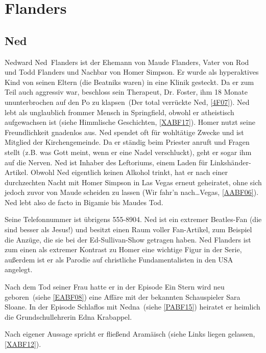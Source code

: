 \section{Flanders}

\subsection{Ned}\label{NedFlanders}
Nedward \glqq Ned\grqq\ Flanders ist der Ehemann von Maude Flanders, Vater von Rod und Todd Flanders und Nachbar von Homer Simpson. Er wurde als hyperaktives Kind von seinen Eltern (die Beatniks waren) in eine Klinik gesteckt. Da er zum Teil auch aggressiv war, beschloss sein Therapeut, Dr. Foster, ihm 18 Monate ununterbrochen auf den Po zu \glqq klapsen\grqq\ (\glqq Der total verrückte Ned\grqq , \ref{4F07}). Ned lebt als unglaublich frommer Mensch in Springfield, obwohl er atheistisch aufgewachsen ist (siehe \glqq Himmlische Geschichten\grqq, \ref{XABF17}). Homer nutzt seine Freundlichkeit gnadenlos aus. Ned spendet oft für wohltätige Zwecke und ist Mitglied der Kirchengemeinde. Da er ständig beim Priester anruft und Fragen stellt (z.B. was Gott meint, wenn er eine Nadel verschluckt), geht er sogar ihm auf die Nerven. Ned ist Inhaber des Leftoriums, einem Laden für Linkshänder-Artikel. Obwohl Ned eigentlich keinen Alkohol trinkt, hat er nach einer durchzechten Nacht mit Homer Simpson in Las Vegas erneut geheiratet, ohne sich jedoch zuvor von Maude scheiden zu lassen (\glqq Wir fahr'n nach\dots Vegas\grqq , \ref{AABF06}). Ned lebt also de facto in Bigamie bis Maudes Tod. 

Seine Telefonnummer ist übrigens 555-8904. Ned ist ein extremer Beatles-Fan (\glqq die sind besser als Jesus!\grqq ) und besitzt einen Raum voller Fan-Artikel, zum Beispiel die Anzüge, die sie bei der Ed-Sullivan-Show getragen haben.
Ned Flanders ist zum einen als extremer Kontrast zu Homer eine wichtige Figur in der Serie, außerdem ist er als Parodie auf christliche Fundamentalisten in den USA angelegt.

Nach dem Tod seiner Frau hatte er in der Episode \glqq Ein Stern wird neu geboren\grqq\ (siehe \ref{EABF08}) eine Affäre mit der bekannten Schauspieler Sara Sloane. In der Episode \glqq Schlaflos mit Nedna\grqq\ (siehe \ref{PABF15}) heiratet er heimlich die Grundschullehrerin Edna Krabappel.

Nach eigener Aussage spricht er fließend Aramäisch (siehe \glqq Links liegen gelassen\grqq, \ref{XABF12}).


